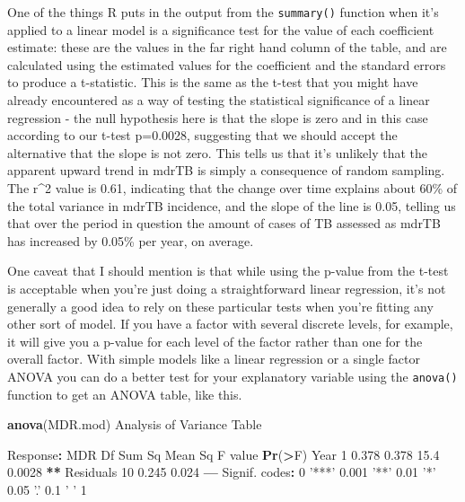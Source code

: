\documentclass[
]{book}
\newenvironment{Shaded}{\begin{snugshade}}{\end{snugshade}}
\newcommand{\DecValTok}[1]{\textcolor[rgb]{0.00,0.00,0.81}{#1}}
\newcommand{\FloatTok}[1]{\textcolor[rgb]{0.00,0.00,0.81}{#1}}
\newcommand{\KeywordTok}[1]{\textcolor[rgb]{0.13,0.29,0.53}{\textbf{#1}}}
\newcommand{\NormalTok}[1]{#1}
\newcommand{\OperatorTok}[1]{\textcolor[rgb]{0.81,0.36,0.00}{\textbf{#1}}}
\newcommand{\StringTok}[1]{\textcolor[rgb]{0.31,0.60,0.02}{#1}}
\begin{document}
One of the things R puts in the output from the \texttt{summary()} function when it's applied to a linear model is a significance test for the value of each coefficient estimate: these are the values in the far right hand column of the table, and are calculated using the estimated values for the coefficient and the standard errors to produce a t-statistic. This is the same as the t-test that you might have already encountered as a way of testing the statistical significance of a linear regression - the null hypothesis here is that the slope is zero and in this case according to our t-test p=0.0028, suggesting that we should accept the alternative that the slope is not zero. This tells us that it's unlikely that the apparent upward trend in mdrTB is simply a consequence of random sampling. The r\^{}2 value is 0.61, indicating that the change over time explains about 60\% of the total variance in mdrTB incidence, and the slope of the line is 0.05, telling us that over the period in question the amount of cases of TB assessed as mdrTB has increased by 0.05\% per year, on average.

One caveat that I should mention is that while using the p-value from the t-test is acceptable when you're just doing a straightforward linear regression, it's not generally a good idea to rely on these particular tests when you're fitting any other sort of model. If you have a factor with several discrete levels, for example, it will give you a p-value for each level of the factor rather than one for the overall factor. With simple models like a linear regression or a single factor ANOVA you can do a better test for your explanatory variable using the \texttt{anova()} function to get an ANOVA table, like this.

\begin{Shaded}
\begin{Highlighting}[]
\KeywordTok{anova}\NormalTok{(MDR.mod)}
\NormalTok{Analysis of Variance Table}

\NormalTok{Response}\OperatorTok{:}\StringTok{ }\NormalTok{MDR}
\NormalTok{          Df Sum Sq Mean Sq F value }\KeywordTok{Pr}\NormalTok{(}\OperatorTok{>}\NormalTok{F)   }
\NormalTok{Year       }\DecValTok{1}  \FloatTok{0.378}   \FloatTok{0.378}    \FloatTok{15.4} \FloatTok{0.0028} \OperatorTok{**}
\NormalTok{Residuals }\DecValTok{10}  \FloatTok{0.245}   \FloatTok{0.024}                  
\OperatorTok{---}
\NormalTok{Signif. codes}\OperatorTok{:}\StringTok{  }\DecValTok{0} \StringTok{'***'} \FloatTok{0.001} \StringTok{'**'} \FloatTok{0.01} \StringTok{'*'} \FloatTok{0.05} \StringTok{'.'} \FloatTok{0.1} \StringTok{' '} \DecValTok{1}
\end{Highlighting}
\end{Shaded}
\end{document}
